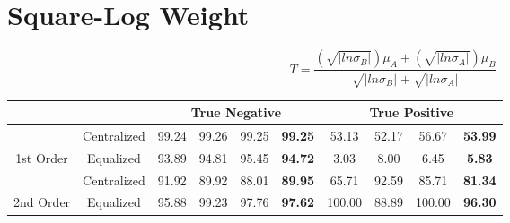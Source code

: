 \documentclass[10pt,a4paper]{article}
\begin{document}
	\section{Square-Log Weight}
		$$T = \frac{(\sqrt{|ln\sigma_B|})\mu_A + (\sqrt{|ln\sigma_A|})\mu_B}{\sqrt{|ln\sigma_B|} + \sqrt{|ln\sigma_A|}}$$
		\begin{table}[!h]
			\centering
			\begin{tabular}{|c|c|c|c|c|c|c|c|c|c|}
				\hline
				&             & \multicolumn{4}{c|}{True Negative}                            & \multicolumn{4}{c|}{True Positive}                              \\ \hline
				& Centralized & 99.24 & 99.26 & 99.25 & {\color[HTML]{FE0000} \textbf{99.25}} & 53.13  & 52.17 & 56.67  & {\color[HTML]{FE0000} \textbf{53.99}} \\ \cline{2-10} 
				\multirow{-2}{*}{1st Order} & Equalized   & 93.89 & 94.81 & 95.45 & {\color[HTML]{FE0000} \textbf{94.72}} & 3.03   & 8.00  & 6.45   & {\color[HTML]{FE0000} \textbf{5.83}}  \\ \hline
				& Centralized & 91.92 & 89.92 & 88.01 & {\color[HTML]{FE0000} \textbf{89.95}} & 65.71  & 92.59 & 85.71  & {\color[HTML]{FE0000} \textbf{81.34}} \\ \cline{2-10} 
				\multirow{-2}{*}{2nd Order} & Equalized   & 95.88 & 99.23 & 97.76 & {\color[HTML]{FE0000} \textbf{97.62}} & 100.00 & 88.89 & 100.00 & {\color[HTML]{FE0000} \textbf{96.30}} \\ \hline
			\end{tabular}
		\end{table}
	
\end{document}
